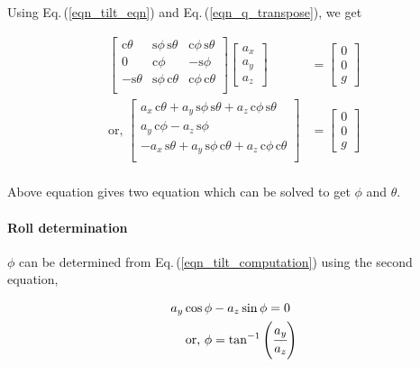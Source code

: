 \documentclass[12pt, a4paper]{article}
\begin{document}
Using Eq.\,(\ref{eqn_tilt_eqn}) and Eq.\,(\ref{eqn_q_transpose}), we get

\begin{equation}
\begin{split}
\begin{bmatrix}
\text{c}\theta & \text{s}\phi\,\text{s}\theta &  \text{c}\phi\,\text{s}\theta \\
0 & \text{c}\phi & -\text{s}\phi \\
-\text{s}\theta & \text{s}\phi\,\text{c}\theta & \text{c}\phi\,\text{c}\theta \\
\end{bmatrix}
\begin{bmatrix}
 a_{x} \\ a_{y} \\ a_{z}
\end{bmatrix}
&=
\begin{bmatrix}
 0 \\ 0 \\ g
\end{bmatrix} \\
\text{or, }
\begin{bmatrix}
a_x\,\text{c}\theta + a_y\,\text{s}\phi\,\text{s}\theta +  a_z\,\text{c}\phi\,\text{s}\theta\\
a_y\,\text{c}\phi -a_z\,\text{s}\phi \\
-a_x\,\text{s}\theta + a_y\,\text{s}\phi\,\text{c}\theta + a_z\,\text{c}\phi\,\text{c}\theta \\
\end{bmatrix} &=
\begin{bmatrix}
 0 \\ 0 \\ g
\end{bmatrix} \\
\end{split}
\label{eqn_tilt_computation}
\end{equation}

Above equation gives two equation which can be solved to get $\phi$ and $\theta$.

\paragraph{Roll determination}
$\phi$ can be determined from Eq.\,({\ref{eqn_tilt_computation}}) using the second equation,

\begin{equation}
\begin{split}
a_{y}\cos{\phi} &- a_{z}\sin{\phi} = 0 \\
\text{or, } \phi &= \tan^{-1}{\left(\cfrac{a_{y}}{a_{z}}\right)} \\
\end{split}
\end{equation}
\end{document}

